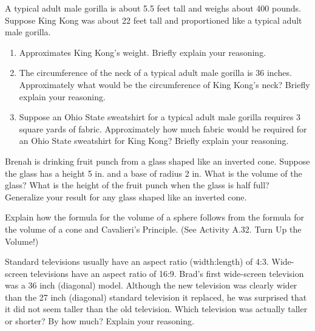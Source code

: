 \begin{prob}
A typical adult male gorilla is about 5.5 feet tall and weighs about 400 pounds. Suppose King Kong was about 22 feet tall and proportioned like a typical adult male gorilla.
\begin{enumerate}
\item Approximates King Kong's weight. Briefly explain your reasoning.
\item The circumference of the neck of a typical adult male gorilla is 36 inches. Approximately what would be the circumference of King Kong's neck? Briefly explain your reasoning.
\item Suppose an Ohio State sweatshirt for a typical adult male gorilla requires 3 square yards of fabric.  Approximately how much fabric would be required for an Ohio State sweatshirt for King Kong?  Briefly explain your reasoning.
\end{enumerate}
\end{prob}

\begin{prob}
Brenah is drinking fruit punch from a glass shaped like an inverted cone.  Suppose the glass has a height 5 in. and a base of radius 2 in.  What is the volume of the glass?  What is the height of the fruit punch when the glass is half full?  Generalize your result for any glass shaped like an inverted cone.  
\end{prob}

\begin{prob}
Explain how the formula for the volume of a sphere follows from the formula for the volume of a cone and Cavalieri's Principle.  (See Activity A.32. Turn Up the Volume!)
\end{prob}

\begin{prob}
Standard televisions usually have an aspect ratio (width:length) of 4:3.  Wide-screen televisions have an aspect ratio of 16:9.  Brad's first wide-screen television was a 36 inch (diagonal) model.  Although the new television was clearly wider than the 27 inch (diagonal) standard television it replaced, he was surprised that it did not seem taller than the old television.  Which television was actually taller or shorter?  By how much?  Explain your reasoning.   
\end{prob}


